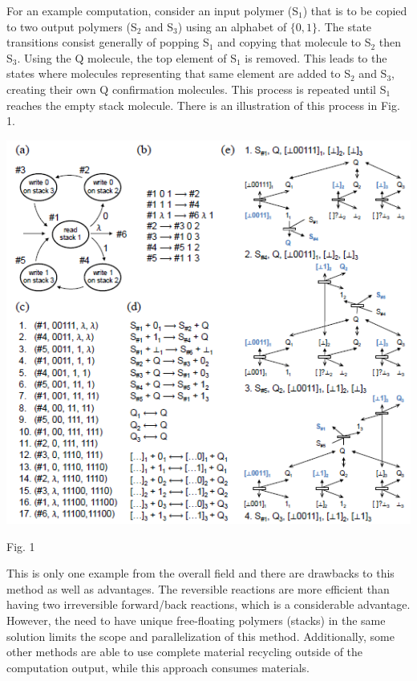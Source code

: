 \documentclass[twocolumn]{article}
\begin{document}
For an example computation, consider an input polymer (S$_1$) that is to
be copied to two output polymers (S$_2$ and S$_3$) using an alphabet of
$\{0,1\}$. The state transitions consist generally of popping S$_1$ and
copying that molecule to S$_2$ then S$_3$.  Using the Q molecule, the top
element of S$_1$ is removed. This leads to the states where molecules
representing that same element are added to S$_2$ and S$_3$, creating their
own Q confirmation molecules. This process is repeated until S$_1$
reaches the empty stack molecule. There is an illustration of this process in
Fig. 1.

\vspace{2em}

\includegraphics[scale=0.43]{zach2.png}
\begin{center}Fig. 1 \cite{qian}\end{center}

\vspace{2em}

This is only one example from the overall field and there are
drawbacks to this method as well as advantages. The reversible
reactions are more efficient than having two irreversible forward/back
reactions, which is a considerable advantage. However, the need to
have unique free-floating polymers (stacks) in the same solution
limits the scope and parallelization of this method. Additionally,
some other methods are able to use complete material recycling outside
of the computation output, while this approach consumes materials.
\end{document}
